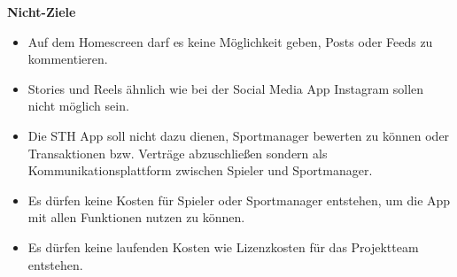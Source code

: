 \textbf{Nicht-Ziele}
\begin{itemize}
    \item Auf dem Homescreen darf es keine Möglichkeit geben, Posts oder Feeds zu kommentieren.
    \item Stories und Reels ähnlich wie bei der Social Media App Instagram sollen nicht möglich sein.
    \item Die STH App soll nicht dazu dienen, Sportmanager bewerten zu können oder Transaktionen bzw. Verträge abzuschließen sondern als Kommunikationsplattform zwischen Spieler und Sportmanager.
    \item Es dürfen keine Kosten für Spieler oder Sportmanager entstehen, um die App mit allen Funktionen nutzen zu können.
    \item Es dürfen keine laufenden Kosten wie Lizenzkosten für das Projektteam entstehen.
\end{itemize}